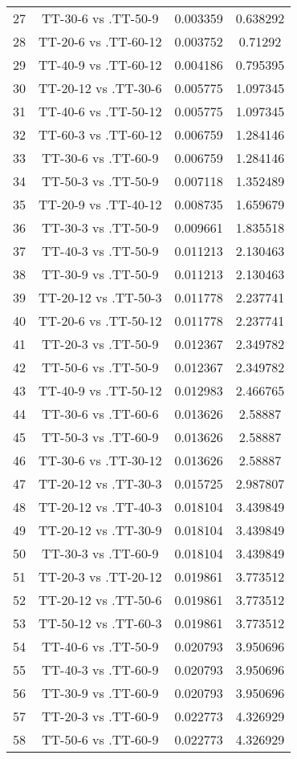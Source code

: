 \documentclass[a4paper,10pt]{article}
\begin{document}
\begin{landscape}
\begin{table}[!htp]
\begin{tabular}{cccc}
27&TT-30-6 vs .TT-50-9&0.003359&0.638292\\
28&TT-20-6 vs .TT-60-12&0.003752&0.71292\\
29&TT-40-9 vs .TT-60-12&0.004186&0.795395\\
30&TT-20-12 vs .TT-30-6&0.005775&1.097345\\
31&TT-40-6 vs .TT-50-12&0.005775&1.097345\\
32&TT-60-3 vs .TT-60-12&0.006759&1.284146\\
33&TT-30-6 vs .TT-60-9&0.006759&1.284146\\
34&TT-50-3 vs .TT-50-9&0.007118&1.352489\\
35&TT-20-9 vs .TT-40-12&0.008735&1.659679\\
36&TT-30-3 vs .TT-50-9&0.009661&1.835518\\
37&TT-40-3 vs .TT-50-9&0.011213&2.130463\\
38&TT-30-9 vs .TT-50-9&0.011213&2.130463\\
39&TT-20-12 vs .TT-50-3&0.011778&2.237741\\
40&TT-20-6 vs .TT-50-12&0.011778&2.237741\\
41&TT-20-3 vs .TT-50-9&0.012367&2.349782\\
42&TT-50-6 vs .TT-50-9&0.012367&2.349782\\
43&TT-40-9 vs .TT-50-12&0.012983&2.466765\\
44&TT-30-6 vs .TT-60-6&0.013626&2.58887\\
45&TT-50-3 vs .TT-60-9&0.013626&2.58887\\
46&TT-30-6 vs .TT-30-12&0.013626&2.58887\\
47&TT-20-12 vs .TT-30-3&0.015725&2.987807\\
48&TT-20-12 vs .TT-40-3&0.018104&3.439849\\
49&TT-20-12 vs .TT-30-9&0.018104&3.439849\\
50&TT-30-3 vs .TT-60-9&0.018104&3.439849\\
51&TT-20-3 vs .TT-20-12&0.019861&3.773512\\
52&TT-20-12 vs .TT-50-6&0.019861&3.773512\\
53&TT-50-12 vs .TT-60-3&0.019861&3.773512\\
54&TT-40-6 vs .TT-50-9&0.020793&3.950696\\
55&TT-40-3 vs .TT-60-9&0.020793&3.950696\\
56&TT-30-9 vs .TT-60-9&0.020793&3.950696\\
57&TT-20-3 vs .TT-60-9&0.022773&4.326929\\
58&TT-50-6 vs .TT-60-9&0.022773&4.326929\\

\end{tabular}
\end{table}
\end{landscape}
\end{document}
